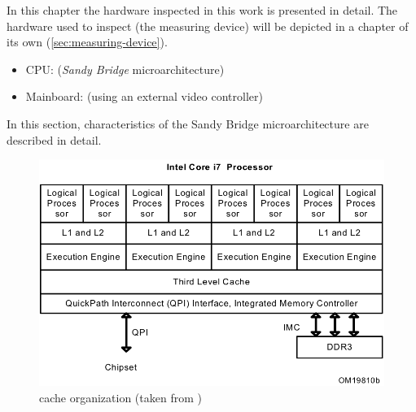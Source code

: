 \label{sec:technical-prerequisites}

In this chapter the hardware inspected in this work is presented in detail. The
hardware used to inspect (the measuring device) will be depicted in a
chapter of its own (\ref{sec:measuring-device}).

\label{sec:hw-products}

\begin{itemize}

\item CPU: \JWPcpu{} (\emph{Sandy Bridge}\cite{wiki:snb} microarchitecture)

\item Mainboard: \JWPboard{} (using an external video controller)

\end{itemize}


\label{sec:sandy-bridge}

In this section, characteristics of the Sandy Bridge microarchitecture are
described in detail.

\begin{figure}
  \centering
    \includegraphics[width=\textwidth]{fig/intel-cache-orga.png}
  \caption{\JWPcpu{} cache organization (taken from \cite{intel2011softdev1})}
  \label{fig:cache-orga}
\end{figure}


\label{sec:sandy-brige-general}

